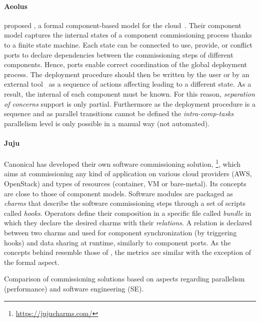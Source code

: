 \paragraph{Aeolus}
\citeauthor{dicosmo2014ic} proposed \aeolus, a formal component-based
model for the cloud~\cite{dicosmo2014ic}. Their component model
captures the internal states of a component commissioning process
thanks to a finite state machine. Each state can be connected to use,
provide, or conflict ports to declare dependencies between the
commissioning steps of different components. Hence, ports enable
correct coordination of the global deployment process. The deployment
procedure should then be written by the user or by an external
tool~\cite{dicosmo:hal-01233489} as a sequence of actions affecting
leading to a different state. As a result, the internal of each
component must be known. For this reason, \emph{separation of
  concerns} support is only partial. Furthermore as the deployment
procedure is a sequence and as parallel transitions cannot be defined
the \emph{intra-comp-tasks} parallelism level is only possible in a
manual way (not automated).

\paragraph{Juju}
Canonical has developed their own software commissioning solution,
\juju\footnote{\url{https://jujucharms.com/}}, which aims at commissioning any
kind of application on various cloud providers (\eg AWS,
OpenStack) and types of resources (container, VM or
bare-metal). Its concepts are close to those of component
models. Software modules are packaged as \juju \emph{charms} that
describe the software commissioning steps through a set of scripts
called
\emph{hooks}. Operators define their composition in a specific file
called \emph{bundle} in which they declare the desired charms with
their \emph{relations}. A relation is declared between two charms and
used for component synchronization (by triggering hooks) and data
sharing at runtime, similarly to component ports. As the concepts
behind \juju resemble those of \aeolus, the metrics are similar with
the exception of the formal aspect.

\begin{table*}[tp]
  \centering
  \small
  
  \caption{Comparison of commissioning solutions based on aspects
  regarding parallelism (performance) and software engineering (SE).}
  \label{tab:comparison}
\end{table*}

